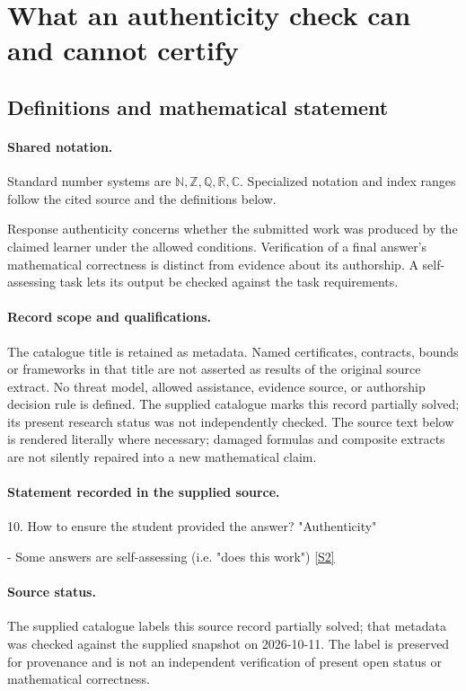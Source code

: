 \documentclass[11pt]{article}
\newcommand{\sref}[2]{\hyperlink{source:#1:#2}{[S#2]}}
\begin{document}
\section{What an authenticity check can and cannot certify}\label{statement}

\subsection{Definitions and mathematical statement}

\paragraph{Shared notation.}Standard number systems are $\mathbb N,\mathbb Z,\mathbb Q,\mathbb R,\mathbb C$. Specialized notation and index ranges follow the cited source and the definitions below.


Response authenticity concerns whether the submitted work was produced by the claimed learner under the allowed conditions. Verification of a final answer's mathematical correctness is distinct from evidence about its authorship. A self-assessing task lets its output be checked against the task requirements.
\paragraph{Record scope and qualifications.}
The catalogue title is retained as metadata. Named certificates, contracts, bounds or frameworks in that title are not asserted as results of the original source extract.
No threat model, allowed assistance, evidence source, or authorship decision rule is defined. The supplied catalogue marks this record partially solved; its present research status was not independently checked.
The source text below is rendered literally where necessary; damaged formulas and composite extracts are not silently repaired into a new mathematical claim.
\paragraph{Statement recorded in the supplied source.}
10. How to ensure the student provided the answer? "Authenticity"

- Some answers are self-assessing (i.e. "does this work") \sref{statement}{2}
\paragraph{Source status.}
The supplied catalogue labels this source record partially solved; that metadata was checked against the supplied snapshot on 2026-10-11. The label is preserved for provenance and is not an independent verification of present open status or mathematical correctness.
\end{document}
